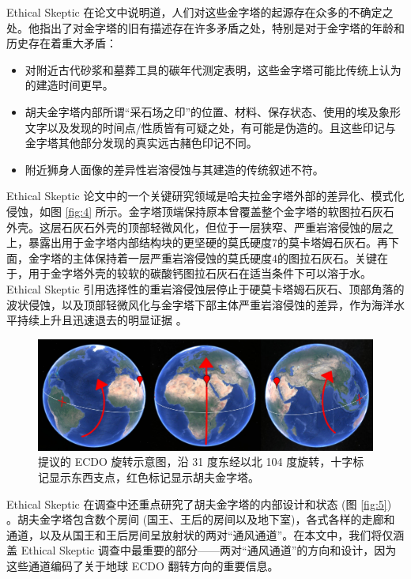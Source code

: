 \documentclass[10pt,twocolumn,letterpaper]{article}
\begin{document}
Ethical Skeptic 在论文中说明道，人们对这些金字塔的起源存在众多的不确定之处。他指出了对金字塔的旧有描述存在许多矛盾之处，特别是对于金字塔的年龄和历史存在着重大矛盾：

\begin{flushleft}
\begin{itemize}
    \item 对附近古代砂浆和墓葬工具的碳年代测定表明，这些金字塔可能比传统上认为的建造时间更早。
    \item 胡夫金字塔内部所谓“采石场之印”的位置、材料、保存状态、使用的埃及象形文字以及发现的时间点/性质皆有可疑之处，有可能是伪造的。且这些印记与金字塔其他部分发现的真实远古赭色印记不同。
    \item 附近狮身人面像的差异性岩溶侵蚀与其建造的传统叙述不符。
\end{itemize}
\end{flushleft}


Ethical Skeptic 论文中的一个关键研究领域是哈夫拉金字塔外部的差异化、模式化侵蚀，如图 \ref{fig:4} 所示。金字塔顶端保持原本曾覆盖整个金字塔的软图拉石灰石外壳。这层石灰石外壳的顶部轻微风化，但位于一层狭窄、严重岩溶侵蚀的层之上，暴露出用于金字塔内部结构块的更坚硬的莫氏硬度7的莫卡塔姆石灰石。再下面，金字塔的主体保持着一层严重岩溶侵蚀的莫氏硬度4的图拉石灰石。关键在于，用于金字塔外壳的较软的碳酸钙图拉石灰石在适当条件下可以溶于水。Ethical Skeptic 引用选择性的重岩溶侵蚀层停止于硬莫卡塔姆石灰石、顶部角落的波状侵蚀，以及顶部轻微风化与金字塔下部主体严重岩溶侵蚀的差异，作为海洋水平持续上升且迅速退去的明显证据 \cite{27}。

\begin{figure}[b]
\begin{center}
\includegraphics[width=1\textwidth]{drawing.jpg}
\end{center}
   \caption{提议的 ECDO 旋转示意图，沿 31 度东经以北 104 度旋转，十字标记显示东西支点，红色标记显示胡夫金字塔。}
\label{fig:6}
\end{figure}

Ethical Skeptic 在调查中还重点研究了胡夫金字塔的内部设计和状态 (图 \ref{fig:5}) \cite{28}。胡夫金字塔包含数个房间 (国王、王后的房间以及地下室)，各式各样的走廊和通道，以及从国王和王后房间呈放射状的两对“通风通道”\cite{29,30}。在本文中，我们将仅涵盖 Ethical Skeptic 调查中最重要的部分——两对“通风通道”的方向和设计，因为这些通道编码了关于地球 ECDO 翻转方向的重要信息。
\end{document}

